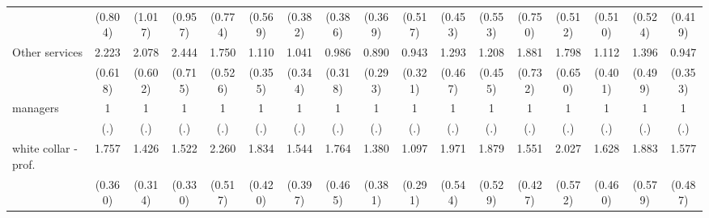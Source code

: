 {\begin{tabular}{l*{16}{c}}
                    &     (0.804)         &     (1.017)         &     (0.957)         &     (0.774)         &     (0.569)         &     (0.382)         &     (0.386)         &     (0.369)         &     (0.517)         &     (0.453)         &     (0.553)         &     (0.750)         &     (0.512)         &     (0.510)         &     (0.524)         &     (0.419)         \\
[1em]
Other services      &       2.223\sym{**} &       2.078\sym{*}  &       2.444\sym{**} &       1.750         &       1.110         &       1.041         &       0.986         &       0.890         &       0.943         &       1.293         &       1.208         &       1.881         &       1.798         &       1.112         &       1.396         &       0.947         \\
                    &     (0.618)         &     (0.602)         &     (0.715)         &     (0.526)         &     (0.355)         &     (0.344)         &     (0.318)         &     (0.293)         &     (0.321)         &     (0.467)         &     (0.455)         &     (0.732)         &     (0.650)         &     (0.401)         &     (0.499)         &     (0.353)         \\
[1em]
managers            &           1         &           1         &           1         &           1         &           1         &           1         &           1         &           1         &           1         &           1         &           1         &           1         &           1         &           1         &           1         &           1         \\
                    &         (.)         &         (.)         &         (.)         &         (.)         &         (.)         &         (.)         &         (.)         &         (.)         &         (.)         &         (.)         &         (.)         &         (.)         &         (.)         &         (.)         &         (.)         &         (.)         \\
[1em]
white collar - prof.&       1.757\sym{**} &       1.426         &       1.522         &       2.260\sym{***}&       1.834\sym{**} &       1.544         &       1.764\sym{*}  &       1.380         &       1.097         &       1.971\sym{*}  &       1.879\sym{*}  &       1.551         &       2.027\sym{*}  &       1.628         &       1.883\sym{*}  &       1.577         \\
                    &     (0.360)         &     (0.314)         &     (0.330)         &     (0.517)         &     (0.420)         &     (0.397)         &     (0.465)         &     (0.381)         &     (0.291)         &     (0.544)         &     (0.529)         &     (0.427)         &     (0.572)         &     (0.460)         &     (0.579)         &     (0.487)         \\

\end{tabular}}
